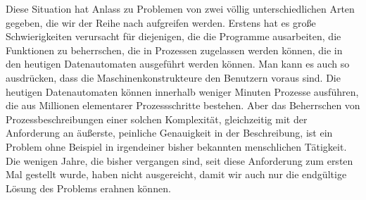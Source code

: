 {Diese Situation hat Anlass zu Problemen von zwei völlig unterschiedlichen Arten gegeben, die wir der Reihe nach aufgreifen werden. Erstens hat es große Schwierigkeiten verursacht für diejenigen, die die Programme ausarbeiten, die Funktionen zu beherrschen, die in Prozessen zugelassen werden können, die in den heutigen Datenautomaten ausgeführt werden können. Man kann es auch so ausdrücken, dass die Maschinenkonstrukteure den Benutzern voraus sind. Die heutigen Datenautomaten können innerhalb weniger Minuten Prozesse ausführen, die aus Millionen elementarer Prozessschritte bestehen. Aber das Beherrschen von Prozessbeschreibungen einer solchen Komplexität, gleichzeitig mit der Anforderung an äußerste, peinliche Genauigkeit in der Beschreibung, ist ein Problem ohne Beispiel in irgendeiner bisher bekannten menschlichen Tätigkeit. Die wenigen Jahre, die bisher vergangen sind, seit diese Anforderung zum ersten Mal gestellt wurde, haben nicht ausgereicht, damit wir auch nur die endgültige Lösung des Problems erahnen können.
}


